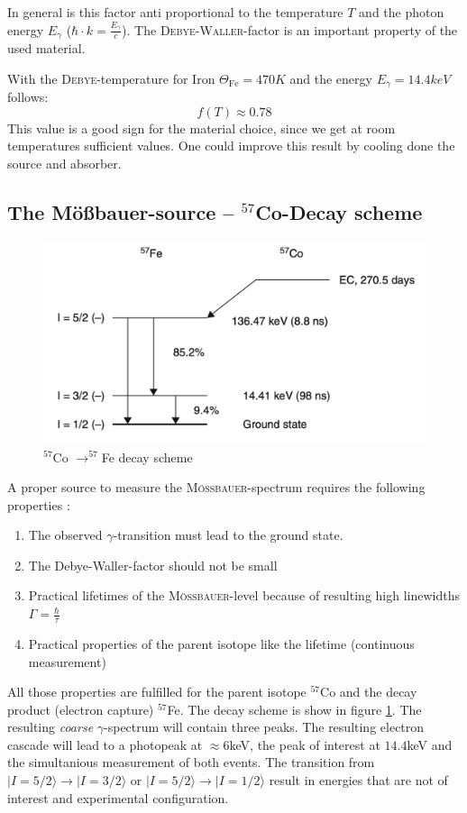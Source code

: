 \documentclass[11pt,a4paper,notitlepage]{scrartcl}
\begin{document}
In general is this factor anti proportional to the temperature $T$ and the photon energy $E_\gamma$ ($\hbar\cdot k=\frac{E_\gamma}{c}$). The \textsc{Debye-Waller}-factor is an important property of the used material. \cite{schatz}

With the \textsc{Debye}-temperature for Iron $\Theta_{\text{Fe}}=470K$ \cite{solids} and the energy $E_\gamma=14.4keV$ follows:
$$f(T)\approx 0.78$$
This value is a good sign for the material choice, since we get at room temperatures sufficient values. One could improve this result by cooling done the source and absorber.
\newpage
\subsection{The Mö\ss bauer-source -- $^{57}$Co-Decay scheme}
\begin{figure}
	\centering
	\includegraphics[width=\linewidth]{figs/scheme.png}
	\caption{$^{57}$Co $\to ^{57}$Fe decay scheme \cite{chemistry}}\label{fig:decay_scheme}
\end{figure}

A proper source to measure the \textsc{Mö\ss bauer}-spectrum requires the following properties \cite{schatz}:
\begin{enumerate}
	\item The observed $\gamma$-transition must lead to the ground state.
	\item The Debye-Waller-factor should not be small
	\item Practical lifetimes of the \textsc{Mö\ss bauer}-level because of resulting high linewidths $\Gamma=\frac{\hbar}{\tau}$
	\item Practical properties of the parent isotope like the lifetime (continuous measurement)
\end{enumerate}
All those properties are fulfilled for the parent isotope $^{57}$Co and the decay product (electron capture) $^{57}$Fe. The decay scheme is show in figure \ref{fig:decay_scheme}. The resulting \emph{coarse} $\gamma$-spectrum will contain three peaks. The resulting electron cascade will lead to a photopeak at $\approx 6$keV, the peak of interest at $14.4$keV and the simultanious measurement of both events. The transition from $|I=5/2\rangle\to|I=3/2\rangle$ or $|I=5/2\rangle\to|I=1/2\rangle$ result in energies that are not of interest and experimental configuration.
\end{document}
